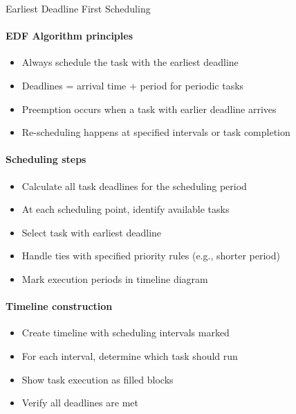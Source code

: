 \begin{KR}{Earliest Deadline First Scheduling}
    \paragraph{EDF Algorithm principles}
    \begin{itemize}
        \item Always schedule the task with the earliest deadline
        \item Deadlines = arrival time + period for periodic tasks
        \item Preemption occurs when a task with earlier deadline arrives
        \item Re-scheduling happens at specified intervals or task completion
    \end{itemize}
    
    \paragraph{Scheduling steps}
    \begin{itemize}
        \item Calculate all task deadlines for the scheduling period
        \item At each scheduling point, identify available tasks
        \item Select task with earliest deadline
        \item Handle ties with specified priority rules (e.g., shorter period)
        \item Mark execution periods in timeline diagram
    \end{itemize}
    
    \paragraph{Timeline construction}
    \begin{itemize}
        \item Create timeline with scheduling intervals marked
        \item For each interval, determine which task should run
        \item Show task execution as filled blocks
        \item Verify all deadlines are met
    \end{itemize}
\end{KR}


